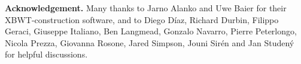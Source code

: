 \begin{small}
\noindent \textbf{Acknowledgement.} Many thanks to Jarno Alanko and Uwe Baier for their XBWT-construction software, and to Diego D\'iaz, Richard Durbin, Filippo Geraci, Giuseppe Italiano, Ben Langmead, Gonzalo Navarro, Pierre Peterlongo, Nicola Prezza, Giovanna Rosone, Jared Simpson, Jouni Sir\'en and Jan Studen\'y for helpful discussions.

\end{small}




